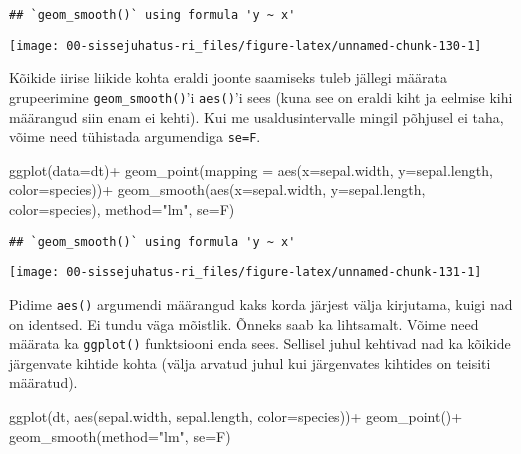 \documentclass[
]{book}
\newenvironment{Shaded}{\begin{snugshade}}{\end{snugshade}}
\newcommand{\AttributeTok}[1]{\textcolor[rgb]{0.77,0.63,0.00}{#1}}
\newcommand{\FunctionTok}[1]{\textcolor[rgb]{0.00,0.00,0.00}{#1}}
\newcommand{\NormalTok}[1]{#1}
\newcommand{\SpecialCharTok}[1]{\textcolor[rgb]{0.00,0.00,0.00}{#1}}
\newcommand{\StringTok}[1]{\textcolor[rgb]{0.31,0.60,0.02}{#1}}
\begin{document}
\begin{verbatim}
## `geom_smooth()` using formula 'y ~ x'
\end{verbatim}

\begin{center}\texttt{[image: 00-sissejuhatus-ri\_files/figure-latex/unnamed-chunk-130-1]} \end{center}

Kõikide iirise liikide kohta eraldi joonte saamiseks tuleb jällegi määrata grupeerimine \texttt{geom\_smooth()}'i \texttt{aes()}'i sees (kuna see on eraldi kiht ja eelmise kihi määrangud siin enam ei kehti). Kui me usaldusintervalle mingil põhjusel ei taha, võime need tühistada argumendiga \texttt{se=F}.

\begin{Shaded}
\begin{Highlighting}[]
\FunctionTok{ggplot}\NormalTok{(}\AttributeTok{data=}\NormalTok{dt)}\SpecialCharTok{+}
  \FunctionTok{geom\_point}\NormalTok{(}\AttributeTok{mapping =} \FunctionTok{aes}\NormalTok{(}\AttributeTok{x=}\NormalTok{sepal.width, }\AttributeTok{y=}\NormalTok{sepal.length, }\AttributeTok{color=}\NormalTok{species))}\SpecialCharTok{+}
  \FunctionTok{geom\_smooth}\NormalTok{(}\FunctionTok{aes}\NormalTok{(}\AttributeTok{x=}\NormalTok{sepal.width, }\AttributeTok{y=}\NormalTok{sepal.length, }\AttributeTok{color=}\NormalTok{species), }\AttributeTok{method=}\StringTok{"lm"}\NormalTok{, }\AttributeTok{se=}\NormalTok{F)}
\end{Highlighting}
\end{Shaded}

\begin{verbatim}
## `geom_smooth()` using formula 'y ~ x'
\end{verbatim}

\begin{center}\texttt{[image: 00-sissejuhatus-ri\_files/figure-latex/unnamed-chunk-131-1]} \end{center}

Pidime \texttt{aes()} argumendi määrangud kaks korda järjest välja kirjutama, kuigi nad on identsed. Ei tundu väga mõistlik. Õnneks saab ka lihtsamalt. Võime need määrata ka \texttt{ggplot()} funktsiooni enda sees. Sellisel juhul kehtivad nad ka kõikide järgenvate kihtide kohta (välja arvatud juhul kui järgenvates kihtides on teisiti määratud).

\begin{Shaded}
\begin{Highlighting}[]
\FunctionTok{ggplot}\NormalTok{(dt, }\FunctionTok{aes}\NormalTok{(sepal.width, sepal.length, }\AttributeTok{color=}\NormalTok{species))}\SpecialCharTok{+}
  \FunctionTok{geom\_point}\NormalTok{()}\SpecialCharTok{+}
  \FunctionTok{geom\_smooth}\NormalTok{(}\AttributeTok{method=}\StringTok{"lm"}\NormalTok{, }\AttributeTok{se=}\NormalTok{F)}
\end{Highlighting}
\end{Shaded}
\end{document}
